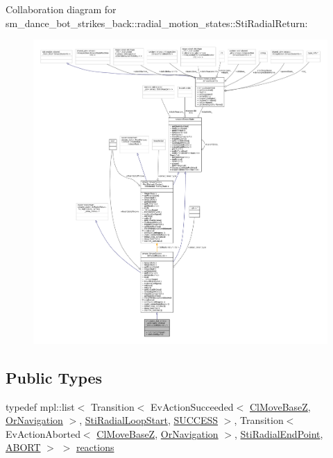 Collaboration diagram for sm\+\_\+dance\+\_\+bot\+\_\+strikes\+\_\+back\+:\+:radial\+\_\+motion\+\_\+states\+:\+:Sti\+Radial\+Return\+:
\nopagebreak
\begin{figure}[H]
\begin{center}
\leavevmode
\includegraphics[width=350pt]{structsm__dance__bot__strikes__back_1_1radial__motion__states_1_1StiRadialReturn__coll__graph}
\end{center}
\end{figure}
\subsection*{Public Types}
\begin{DoxyCompactItemize}
\item 
typedef mpl\+::list$<$ Transition$<$ Ev\+Action\+Succeeded$<$ \hyperlink{classmove__base__z__client_1_1ClMoveBaseZ}{Cl\+Move\+BaseZ}, \hyperlink{classsm__dance__bot__strikes__back_1_1OrNavigation}{Or\+Navigation} $>$, \hyperlink{structsm__dance__bot__strikes__back_1_1radial__motion__states_1_1StiRadialLoopStart}{Sti\+Radial\+Loop\+Start}, \hyperlink{classSUCCESS}{S\+U\+C\+C\+E\+SS} $>$, Transition$<$ Ev\+Action\+Aborted$<$ \hyperlink{classmove__base__z__client_1_1ClMoveBaseZ}{Cl\+Move\+BaseZ}, \hyperlink{classsm__dance__bot__strikes__back_1_1OrNavigation}{Or\+Navigation} $>$, \hyperlink{structsm__dance__bot__strikes__back_1_1radial__motion__states_1_1StiRadialEndPoint}{Sti\+Radial\+End\+Point}, \hyperlink{classABORT}{A\+B\+O\+RT} $>$ $>$ \hyperlink{structsm__dance__bot__strikes__back_1_1radial__motion__states_1_1StiRadialReturn_a5f99f31252e2cbcafad66ec9e9f8b91d}{reactions}
\end{DoxyCompactItemize}
